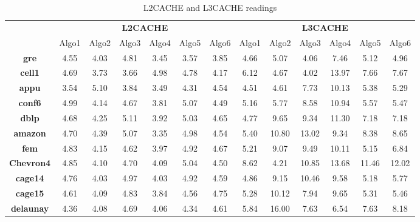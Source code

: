 \begin{table*}[th]
\small
\centering

\begin{tabular}{ c|c|c|c|c|c|c|c|c|c|c|c|c| }
  \cline{2-13}
&
\multicolumn{6}{c}{\textbf{L2CACHE}} &
  \multicolumn{6}{|c}{\textbf{L3CACHE}} \\
  \cline{2-13}
  \multicolumn{1}{c|}{} &
  Algo1 & Algo2 & Algo3 & Algo4 & Algo5 & Algo6 & Algo1 & Algo2 & Algo3 & Algo4 & Algo5 & Algo6\\\hline
  \hline
  \multicolumn{1}{|c|}{\textbf{gre}}
& 4.55 & 4.03 & 4.81 & 3.45 & 3.57 & 3.85 & 4.66 & 5.07 & 4.06 & 7.46 & 5.12 & 4.96 \\ \hline
  \hline
  \multicolumn{1}{|c|}{\textbf{cell1}}
& 4.69 & 3.73 & 3.66 & 4.98 & 4.78 & 4.17 & 6.12 & 4.67 & 4.02 & 13.97 & 7.66 & 7.67\\ \hline
  \hline
  \multicolumn{1}{|c|}{\textbf{appu}}
& 3.54 & 5.10 & 3.84 & 3.49 & 4.31 & 4.54 & 4.51 & 4.61 & 7.73 & 10.13 & 5.38 & 5.29\\ \hline
  \hline
\multicolumn{1}{|c|}{\textbf{conf6}}
& 4.99 & 4.14 & 4.67 & 3.81 & 5.07 & 4.49 & 5.16 & 5.77 & 8.58 & 10.94 & 5.57 & 5.47\\ \hline
  \multicolumn{1}{|c|}{\textbf{dblp}}
& 4.68 & 4.25 & 5.11 & 3.92 & 5.03 & 4.65 & 4.77 & 9.65 & 9.34 & 11.30 & 7.18 & 7.18\\ \hline
  \hline
  \multicolumn{1}{|c|}{\textbf{amazon}}
& 4.70 & 4.39 & 5.07 & 3.35 & 4.98 & 4.54 & 5.40 & 10.80 & 13.02 & 9.34 & 8.38 & 8.65\\ \hline
  \hline
  \multicolumn{1}{|c|}{\textbf{fem}}
& 4.83 & 4.15 & 4.62 & 3.97 & 4.92 & 4.67 & 5.21 & 9.07 & 9.49 & 10.11 & 5.15 & 6.84\\ \hline
  \hline
  \multicolumn{1}{|c|}{\textbf{Chevron4}}
& 4.85 & 4.10 & 4.70 & 4.09 & 5.04 & 4.50 & 8.62 & 4.21 & 10.85 & 13.68 & 11.46 & 12.02\\ \hline
  \hline
  \multicolumn{1}{|c|}{\textbf{cage14}}
& 4.76 & 4.03 & 4.97 & 4.03 & 4.92 & 4.59 & 4.86 & 9.15 & 10.46 & 9.58 & 5.18 & 5.77\\ \hline
  \hline
  \multicolumn{1}{|c|}{\textbf{cage15}}
& 4.61 & 4.09 & 4.83 & 3.84 & 4.56 & 4.75 & 5.28 & 10.12 & 7.94 & 9.65 & 5.31 & 5.46\\ \hline
  \hline
  \multicolumn{1}{|c|}{\textbf{delaunay}}
& 4.36 & 4.08 & 4.69 & 4.06 & 4.34 & 4.61 & 5.84 & 16.00 & 7.63 & 6.54 & 7.63 & 8.18\\ \hline
  \hline
\end{tabular}

\caption{\capfont L2CACHE and L3CACHE readings }
\label{tab:table2}
\end{table*}
